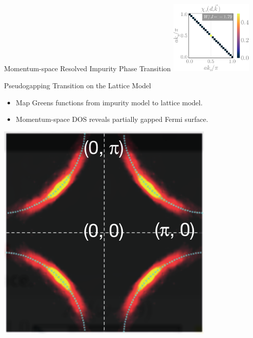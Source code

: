 \documentclass[10pt,aspectratio=169]{beamer}
\begin{document}
\begin{frame}{Momentum-space Resolved Impurity Phase Transition}
{{		\hspace*{\fill}
		\includegraphics[width=0.3\textwidth]{SF-6.pdf}
	}
	}
\end{frame}

\begin{frame}{Pseudogapping Transition on the Lattice Model}
	\begin{minipage}{0.7\textwidth}
	\begin{itemize}
		\item Map Greens functions from impurity model to \alert{lattice model}.
		\item Momentum-space DOS reveals \alert{partially gapped} Fermi surface.
	\end{itemize}
	\end{minipage}
	\begin{minipage}{0.25\textwidth}
		\includegraphics[width=\textwidth]{fermiArc1.png}
	\end{minipage}
	

\end{frame}
\end{document}

